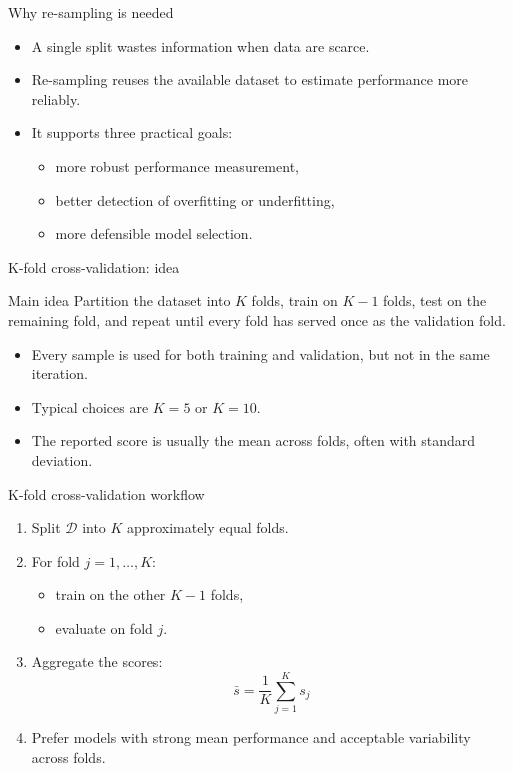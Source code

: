 \documentclass[12pt]{beamer}
\begin{document}
\begin{frame}{Why re-sampling is needed}
  \begin{itemize}
    \item A single split wastes information when data are scarce.
    \item Re-sampling reuses the available dataset to estimate performance more reliably.
    \item It supports three practical goals:
      \begin{itemize}
        \item more robust performance measurement,
        \item better detection of overfitting or underfitting,
        \item more defensible model selection.
      \end{itemize}
  \end{itemize}
\end{frame}

\begin{frame}{K-fold cross-validation: idea}
  \begin{conceptbox}{Main idea}
    Partition the dataset into $K$ folds, train on $K-1$ folds, test on the remaining fold,
    and repeat until every fold has served once as the validation fold.
  \end{conceptbox}
  \begin{itemize}
    \item Every sample is used for both training and validation, but not in the same iteration.
    \item Typical choices are $K=5$ or $K=10$.
    \item The reported score is usually the mean across folds, often with standard deviation.
  \end{itemize}
\end{frame}

\begin{frame}{K-fold cross-validation workflow}
  \begin{enumerate}
    \item Split $\mathcal{D}$ into $K$ approximately equal folds.
    \item For fold $j=1,\ldots,K$:
      \begin{itemize}
        \item train on the other $K-1$ folds,
        \item evaluate on fold $j$.
      \end{itemize}
    \item Aggregate the scores:
      \[
        \bar{s}=\frac{1}{K}\sum_{j=1}^{K}s_j
      \]
    \item Prefer models with strong mean performance and acceptable variability across folds.
  \end{enumerate}
\end{frame}
\end{document}
